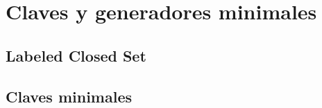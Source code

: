\section{Claves y generadores minimales}

\subsection{Labeled Closed Set}

 
\newpage

\subsection{Claves minimales}

 

\newpage
